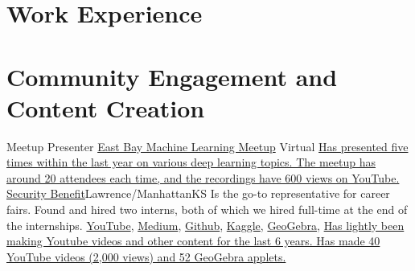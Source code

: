 \documentclass[11pt,a4paper,sans]{moderncv}
\begin{document}
\section{Work Experience}



\section{Community Engagement and Content Creation}
    {Meetup Presenter}
    {\href{https://www.meetup.com/east-bay-tri-valley-machine-learning-meetup/}{East Bay Machine Learning Meetup}}
    {Virtual}{}
    {\href{https://www.youtube.com/playlist?list=PLytZkHFJwKUf-P1Q_AD-hvYKyH0VREKWw}
        {Has presented five times within the last year
        on various deep learning topics.
        The meetup has around 20 attendees each time, and
        the recordings have 600 views on YouTube.}}
    {\href{https://www.securitybenefit.com/splash-page}{Security Benefit}}{Lawrence/Manhattan}{KS}
    {Is the go-to representative for career fairs.
    Found and hired two interns, both of which we hired full-time
    at the end of the internships.}
    {\href{https://www.youtube.com/@grantsmith3653/featured}{YouTube},
    \href{https://medium.com/@14.gsmith.14}{Medium},
    \href{https://github.com/GSmithApps}{Github},
    \href{https://www.kaggle.com/grannysmithapples}{Kaggle},
    \href{https://www.geogebra.org/u/gsmithapples}{GeoGebra},
    }
    {}{}{\href{https://www.youtube.com/@grantsmith3653/featured}{
        Has lightly been making Youtube videos and
        other content for the last 6 years.
        Has made 40 YouTube videos (2,000 views) and 52 GeoGebra applets.}}
            
\end{document}
